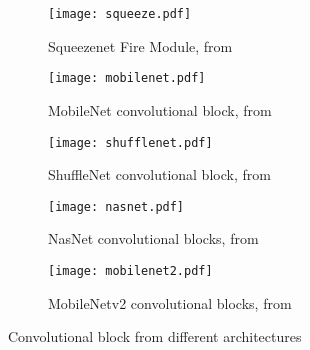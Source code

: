 \begin{figure}[H]
    \centering
    \begin{subfigure}[t]{0.49\linewidth}
        \centering
        \texttt{[image: squeeze.pdf]}
        \caption{Squeezenet Fire Module, from \cite{iandola_squeezenet_2016}}
        \label{fig:archi_building_block:sqn}
    \end{subfigure}
    \begin{subfigure}[t]{0.49\linewidth}
        \centering
        \texttt{[image: mobilenet.pdf]}
        \caption{MobileNet convolutional block, from \cite{howard_mobilenets_2017}}
        \label{fig:archi_building_block:mbn}
    \end{subfigure}
    \begin{subfigure}[t]{0.49\linewidth}
        \centering
        \texttt{[image: shufflenet.pdf]}
        \caption{ShuffleNet convolutional block, from \cite{zhang_shufflenet_2018}}
        \label{fig:archi_building_block:shn}
    \end{subfigure}
    \begin{subfigure}[t]{0.49\linewidth}
        \centering
        \texttt{[image: nasnet.pdf]}
        \caption{NasNet convolutional blocks, from \cite{zoph_learning_2018}}
        \label{fig:archi_building_block:nasn}
    \end{subfigure}
    \begin{subfigure}[t]{0.49\linewidth}
        \centering
        \texttt{[image: mobilenet2.pdf]}
        \caption{MobileNetv2 convolutional blocks, from \cite{sandler_mobilenetv2_2018}}
        \label{fig:archi_building_block:mb2n}
    \end{subfigure}
    \caption{Convolutional block from different architectures}
    \label{fig:archi_building_block}
\end{figure}

